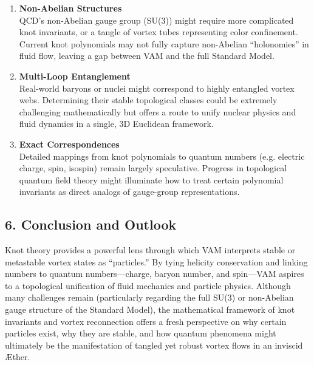 \documentclass[aps,preprint,superscriptaddress]{revtex4-2}
\begin{document}
    \begin{enumerate}
        \item \textbf{Non-Abelian Structures} \\
    QCD’s non-Abelian gauge group (SU(3)) might require more complicated knot invariants, or a tangle of vortex tubes representing color confinement. Current knot polynomials may not fully capture non-Abelian “holonomies” in fluid flow, leaving a gap between VAM and the full Standard Model.
        \item \textbf{Multi-Loop Entanglement} \\
    Real-world baryons or nuclei might correspond to highly entangled vortex webs. Determining their stable topological classes could be extremely challenging mathematically but offers a route to unify nuclear physics and fluid dynamics in a single, 3D Euclidean framework.
        \item \textbf{Exact Correspondences} \\
    Detailed mappings from knot polynomials to quantum numbers (e.g. electric charge, spin, isospin) remain largely speculative. Progress in topological quantum field theory might illuminate how to treat certain polynomial invariants as direct analogs of gauge-group representations.
    \end{enumerate}

    \subsection*{6. Conclusion and Outlook}

    Knot theory provides a powerful lens through which VAM interprets stable or metastable vortex states as “particles.” By tying helicity conservation and linking numbers to quantum numbers—charge, baryon number, and spin—VAM aspires to a topological unification of fluid mechanics and particle physics. Although many challenges remain (particularly regarding the full SU(3) or non-Abelian gauge structure of the Standard Model), the mathematical framework of knot invariants and vortex reconnection offers a fresh perspective on why certain particles exist, why they are stable, and how quantum phenomena might ultimately be the manifestation of tangled yet robust vortex flows in an inviscid Æther.
\end{document}
